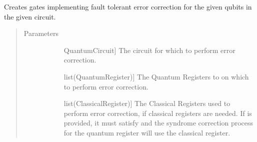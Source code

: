 \documentclass[letterpaper,10pt,english]{sphinxmanual}
\begin{document}
\begin{fulllineitems}
\begin{fulllineitems}
\label{\detokenize{Base:BaseFaultTolerance.ErrorCorrector.errorCorrectCircuit}}
\sphinxAtStartPar
Creates gates implementing fault tolerant error correction for the given qubits in the given circuit.
\begin{quote}\begin{description}
\item[{Parameters}] \leavevmode\begin{description}
\item[{}] \leavevmode{[}QuantumCircuit{]}
\sphinxAtStartPar
The circuit for which to perform error correction.

\item[{}] \leavevmode{[}list(QuantumRegister){]}
\sphinxAtStartPar
The Quantum Registers to on which to perform error correction.

\item[{}] \leavevmode{[}list(ClassicalRegister){]}
\sphinxAtStartPar
The Classical Registers used to perform error correction, if classical registers are needed. If  is provided, it must satisfy  and the syndrome correction process for the  quantum register will use the  classical register.

\end{description}

\end{description}\end{quote}

\end{fulllineitems}



\end{fulllineitems}
\end{document}
